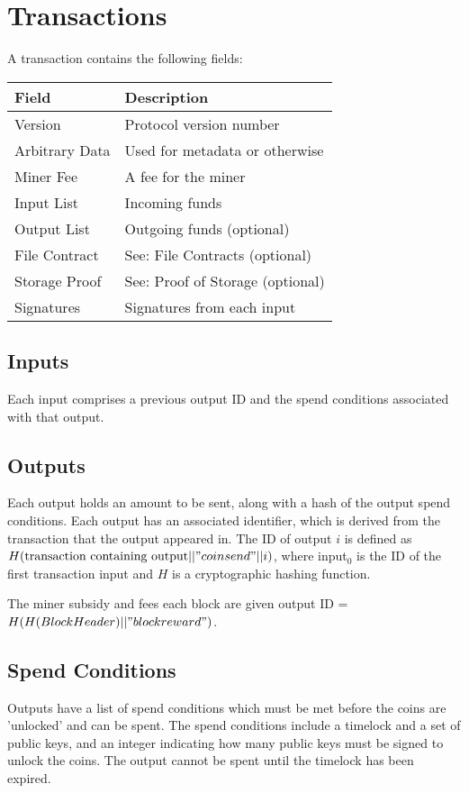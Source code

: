 \documentclass[twocolumn]{article}
\begin{document}
\section{Transactions}
A transaction contains the following fields:
\begin{tabular}{| l | l |}
	\hline
	\textbf{Field} & \textbf{Description} \\ \hline
	Version        & Protocol version number \\ \hline
	Arbitrary Data & Used for metadata or otherwise \\ \hline
	Miner Fee      & A fee for the miner \\ \hline
	Input List     & Incoming funds \\ \hline
	Output List    & Outgoing funds (optional) \\ \hline
	File Contract  & See: File Contracts (optional) \\ \hline
	Storage Proof  & See: Proof of Storage (optional) \\ \hline
	Signatures     & Signatures from each input \\ \hline
\end{tabular}

\subsection{Inputs}
Each input comprises a previous output ID and the spend conditions associated with that output.

\subsection{Outputs}
Each output holds an amount to be sent, along with a hash of the output spend conditions.
Each output has an associated identifier, which is derived from the transaction that the output appeared in.
The ID of output $i$ is defined as $H(\text{transaction containing output} || "coinsend" || i)$,
where input$_0$ is the ID of the first transaction input and $H$ is a cryptographic hashing function.

The miner subsidy and fees each block are given output ID = $H(H(Block Header) || "blockreward")$.

\subsection{Spend Conditions}
Outputs have a list of spend conditions which must be met before the coins are 'unlocked' and can be spent.
The spend conditions include a timelock and a set of public keys, and an integer indicating how many public keys must be signed to unlock the coins.
The output cannot be spent until the timelock has been expired.
\end{document}
